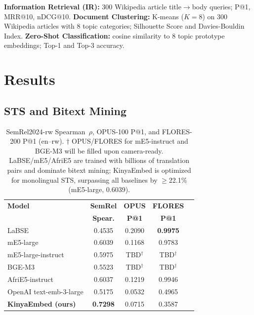 \documentclass[letterpaper]{article} %
\begin{document}
\textbf{Information Retrieval (IR):} 300 Wikipedia article title$\to$body
queries; P@1, MRR@10, nDCG@10. \textbf{Document Clustering:} K-means
($K = 8$) on 300 Wikipedia articles with 8 topic categories; Silhouette
Score and Davies-Bouldin Index. \textbf{Zero-Shot Classification:} cosine
similarity to 8 topic prototype embeddings; Top-1 and Top-3 accuracy.

\section{Results}

\subsection{STS and Bitext Mining}

\begin{table}[t]
\centering
\small
\setlength{\tabcolsep}{4pt}
\begin{tabular}{lcccc}
\toprule
\textbf{Model} & \textbf{SemRel} & \textbf{OPUS} & \textbf{FLORES} \\
               & \textbf{Spear.} & \textbf{P@1}  & \textbf{P@1}   \\
\midrule
LaBSE                       & 0.4535 & 0.2090 & \textbf{0.9975} \\
mE5-large                   & 0.6039 & 0.1168 & 0.9783 \\
mE5-large-instruct          & 0.5975 & TBD$^\dagger$ & TBD$^\dagger$ \\
BGE-M3                      & 0.5523 & TBD$^\dagger$ & TBD$^\dagger$ \\
AfriE5-instruct             & 0.6037 & 0.1219 & 0.9946 \\
OpenAI text-emb-3-large     & 0.5175 & 0.0532 & 0.4965 \\
\midrule
\textbf{KinyaEmbed (ours)}  & \textbf{0.7298} & 0.0715 & 0.3587 \\
\bottomrule
\end{tabular}
\caption{SemRel2024-rw Spearman~$\rho$, OPUS-100 P@1, and FLORES-200 P@1
(en--rw). $\dagger$ OPUS/FLORES for mE5-instruct and BGE-M3 will be filled
upon camera-ready. LaBSE/mE5/AfriE5 are trained with billions of translation
pairs and dominate bitext mining; KinyaEmbed is optimized for monolingual STS,
surpassing all baselines by $\geq$22.1\% (mE5-large, 0.6039).}
\label{tab:main}
\end{table}
\end{document}
